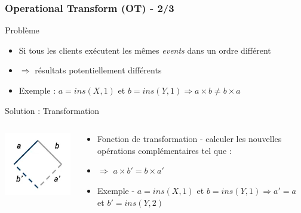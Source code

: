 \documentclass{beamer}
\begin{document}
\begin{frame}
    \frametitle{Operational Transform (OT) - 2/3}
    \begin{block}{Problème}
        \begin{itemize}
            \item Si tous les clients exécutent les mêmes \textit{events} dans un ordre différent
            \item $\Rightarrow$ résultats potentiellement différents
            \item Exemple : $a = ins(X, 1)$ et $b = ins(Y, 1) \Rightarrow a \times b \neq b \times a$
        \end{itemize}
    \end{block}

    \begin{block}{Solution : Transformation}
        \begin{columns}
            \begin{column}{0.3\textwidth}
                \includegraphics[width=\textwidth,height=0.8\textheight,keepaspectratio]{../images/diamond_ot.png}
            \end{column}
            
            \begin{column}{0.7\textwidth}
                \begin{itemize}
                    \item Fonction de transformation - calculer les nouvelles opérations complémentaires tel que :
                    \item $\Rightarrow$ $a \times b' = b \times a'$
                    \item Exemple - $a = ins(X, 1)$ et $b = ins(Y, 1) \Rightarrow a' = a$ et $b' = ins(Y, 2)$
                \end{itemize}
            \end{column}
        \end{columns}
    \end{block}
    

\end{frame}
\end{document}
